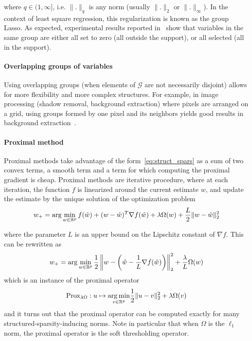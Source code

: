 where $q \in (1, \infty]$, i.e. $\|.\|_q$ is any norm (usually $\|.\|_2$ or $\|.\|_\infty$). In the context of least square regression, this regularization is known as the group Lasso. As expected, experimental results reported in~\cite{Bach:2011kx} show that variables in the same group are either all set to zero (all outside the support), or all selected (all in the support).

\paragraph{Overlapping groups of variables}
Using overlapping groups (when elements of $\mathcal{G}$ are not necessarily disjoint) allows for more flexibility and more complex structures. For example, in image processing (shadow removal, background extraction) where pixels are arranged on a grid, using groups formed by one pixel and its neighbors yields good results in background extraction~\cite{Cevher_sparsesignal}.


\paragraph{Proximal method}
Proximal methods take advantage of the form~\ref{eq:struct_spars} as a sum of two convex terms, a smooth term and a term for which computing the proximal gradient is cheap. Proximal methods are iterative procedure, where at each iteration, the function $f$ is linearized around the current estimate $w$, and update the estimate by the unique solution of the optimization problem
\[
w_+ = \arg \min_{w \in {\mathbb R}^p} f(\hat{w}) + (w - \hat{w})^T\nabla f(\hat{w}) + \lambda \Omega(w) + \frac{L}{2}\|w - \hat{w}\|_2^2
\]

where the parameter $L$ is an upper bound on the Lipschitz constant of $\nabla f$. This can be rewritten as
\[
w_+ = \arg \min_{w \in {\mathbb R}^p} \frac{1}{2} \left\|w - \left( \hat{w} - \frac{1}{L} \nabla f(\hat{w}) \right) \right\|_2^2 + \frac{\lambda}{L} \Omega(w)
\]
which is an instance of the proximal operator
\[
\text{Prox}_{\lambda \Omega} : u \mapsto \underset{v \in {\mathbb R}^p }{\arg \min} \frac{1}{2}\|u - v\|_2^2 + \lambda \Omega(v)
\]
and it turns out that the proximal operator can be computed exactly for many structured-sparsity-inducing norms. Note in particular that when $\Omega$ is the $\ell_1$ norm, the proximal operator is the soft thresholding operator.

